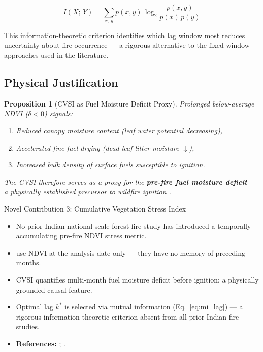 \documentclass[12pt, a4paper]{article}
\newtheorem{proposition}{Proposition}[section]
\begin{document}
\begin{equation}
  I(X;\,Y) =
  \sum_{x,\,y}
  p(x,y)\,\log_{2}\!\frac{p(x,y)}{p(x)\,p(y)}
  \label{eq:mutual_info}
\end{equation}

This information-theoretic criterion identifies which lag window most
reduces uncertainty about fire occurrence --- a rigorous alternative
to the fixed-window approaches used in the literature.

\subsection{Physical Justification}

\begin{proposition}[CVSI as Fuel Moisture Deficit Proxy]
Prolonged below-average NDVI ($\delta < 0$) signals:
\begin{enumerate}[leftmargin=2em]
  \item Reduced canopy moisture content (leaf water potential decreasing),
  \item Accelerated fine fuel drying (dead leaf litter moisture $\downarrow$),
  \item Increased bulk density of surface fuels susceptible to ignition.
\end{enumerate}
The CVSI therefore serves as a proxy for the \textbf{pre-fire fuel
moisture deficit} --- a physically established precursor to wildfire
ignition \citep{chuvieco2004, flannigan2000}.
\end{proposition}

\begin{novelbox}{Novel Contribution 3: Cumulative Vegetation Stress Index}
\begin{itemize}[leftmargin=1.5em,itemsep=2pt]
  \item No prior Indian national-scale forest fire study has introduced
        a temporally accumulating pre-fire NDVI stress metric.
  \item \citet{biswas2025} use NDVI at the analysis date only ---
        they have no memory of preceding months.
  \item CVSI quantifies multi-month fuel moisture deficit before
        ignition: a physically grounded causal feature.
  \item Optimal lag $k^{*}$ is selected via mutual information
        (Eq.~\ref{eq:mi_lag}) --- a rigorous information-theoretic
        criterion absent from all prior Indian fire studies.
  \item \textbf{References:} \citet{chuvieco2004}; \citet{flannigan2000}.
\end{itemize}
\end{novelbox}
\end{document}

